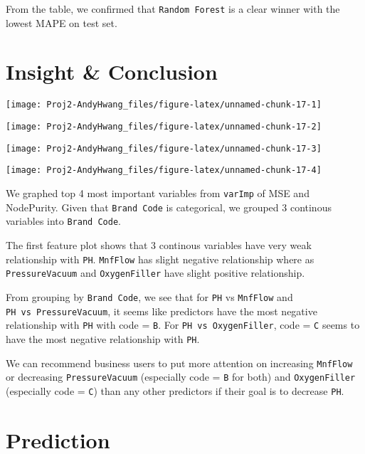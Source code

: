 \documentclass[]{report}
\begin{document}
From the table, we confirmed that \texttt{Random\ Forest} is a clear
winner with the lowest MAPE on test set.

\section{Insight \& Conclusion}\label{insight-conclusion}

\begin{center}\texttt{[image: Proj2-AndyHwang\_files/figure-latex/unnamed-chunk-17-1]} \end{center}

\begin{center}\texttt{[image: Proj2-AndyHwang\_files/figure-latex/unnamed-chunk-17-2]} \end{center}

\begin{center}\texttt{[image: Proj2-AndyHwang\_files/figure-latex/unnamed-chunk-17-3]} \end{center}

\begin{center}\texttt{[image: Proj2-AndyHwang\_files/figure-latex/unnamed-chunk-17-4]} \end{center}

We graphed top 4 most important variables from \texttt{varImp} of MSE
and NodePurity. Given that \texttt{Brand\ Code} is categorical, we
grouped 3 continous variables into \texttt{Brand\ Code}.

The first feature plot shows that 3 continous variables have very weak
relationship with \texttt{PH}. \texttt{MnfFlow} has slight negative
relationship where as \texttt{PressureVacuum} and \texttt{OxygenFiller}
have slight positive relationship.

From grouping by \texttt{Brand\ Code}, we see that for \texttt{PH} vs
\texttt{MnfFlow} and \texttt{PH\ vs\ PressureVacuum}, it seems like
predictors have the most negative relationship with \texttt{PH} with
code = \texttt{B}. For \texttt{PH\ vs\ OxygenFiller}, code = \texttt{C}
seems to have the most negative relationship with \texttt{PH}.

We can recommend business users to put more attention on increasing
\texttt{MnfFlow} or decreasing \texttt{PressureVacuum} (especially code
= \texttt{B} for both) and \texttt{OxygenFiller} (especially code =
\texttt{C}) than any other predictors if their goal is to decrease
\texttt{PH}.

\section{Prediction}\label{prediction}
\end{document}
